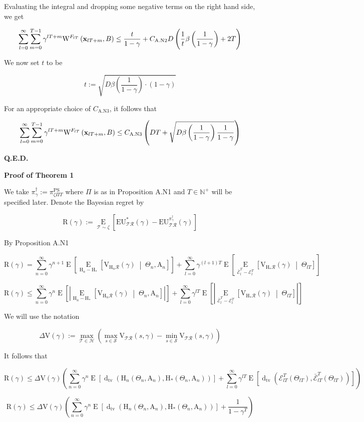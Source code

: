 \documentclass[a4paper]{article}
\newcommand{\Co}[1]{}
\newcommand{\AP}[1]{\left(#1\right)}
\newcommand{\AB}[1]{\left[#1\right]}
\newcommand{\ABM}[2]{\left[#1\;\middle\vert\;#2\right]}
\newcommand{\Ea}[2]{\underset{#1}{\operatorname{E}}\AB{#2}}
\newcommand{\CE}[3]{\underset{#1}{\operatorname{E}}\ABM{#2}{#3}}
\newcommand{\Dtva}[1]{\operatorname{d}_{\text{tv}}\AP{#1}}
\newcommand{\Nats}{\mathbb{N}}
\newcommand{\Abs}[1]{\left\vert #1 \right\vert}
\newcommand{\St}{\mathcal{S}}
\newcommand{\R}{\mathcal{R}}
\newcommand{\T}{\mathcal{T}}
\newcommand{\Hy}{\mathcal{H}}
\newcommand{\V}{\mathrm{V}}
\newcommand{\EU}{\mathrm{EU}}
\newcommand{\Reg}{\mathrm{R}}
\newcommand{\PSR}{\text{PS}}
\newcommand{\W}{\mathrm{W}}
\newcommand{\AT}{\mathrm{A}}
\newcommand{\THy}{\mathrm{H}_*}
\newcommand{\SHy}{\mathrm{H}}
\newcommand{\Ev}{\mathcal{E}}
\newcommand{\De}{\Delta}
\begin{document}
Evaluating the integral and dropping some negative terms on the right hand side, we get

$$\sum_{l=0}^\infty\sum_{m=0}^{T-1}{\gamma^{lT+m}\W^{F_{lT}}\AP{\bold{x}_{lT+m},B}}\leq\frac{t}{1-\gamma}+C_{\text{A.N2}}D \AP{\frac{1}{t}\beta\AP{\frac{1}{1-\gamma}}+2T}$$

We now set $t$ to be

$$t:=\sqrt{D\beta\AP{\frac{1}{1-\gamma}}\cdot(1-\gamma)}$$

For an appropriate choice of $C_{\text{A.N3}}$, it follows that

$$\sum_{l=0}^\infty\sum_{m=0}^{T-1}{\gamma^{lT+m}\W^{F_{lT}}\AP{\bold{x}_{lT+m},B}}\leq C_{\text{A.N3}}\AP{DT+\sqrt{D\beta\AP{\frac{1}{1-\gamma}}\frac{1}{1-\gamma}}}$$

\textbf{Q.E.D.}\Co{b}

\textbf{Proof of Theorem 1}\Co{b}

We take $\pi^\dagger_\gamma:=\pi^\PSR_{\zeta\Pi T}$ where $\Pi$ is as in Proposition A.N1 and $T\in\Nats^+$ will be specified later. Denote the Bayesian regret by

$$\Reg(\gamma):=\Ea{\T\sim\zeta}{\EU^*_{\T\R}(\gamma)-\EU^{\pi_{\gamma}^{\dagger}}_{\T\R}(\gamma)}$$

By Proposition A.N1

$$\Reg(\gamma)=\sum_{n=0}^\infty\gamma^{n+1}\Ea{}{\CE{\SHy_n-\THy}{\V_{\SHy_n\R}(\gamma)}{\Theta_n,\AT_n}}+\sum_{l=0}^\infty{\gamma^{(l+1)T}}\Ea{}{\CE{\bar{\Ev}_{l}^T-\Ev_{l}^T}{\V_{\SHy_*\R}(\gamma)}{\Theta_{lT}}}$$

$$\Reg(\gamma)\leq\sum_{n=0}^\infty\gamma^{n}\Ea{}{\Abs{\CE{\SHy_n-\THy}{\V_{\SHy_n\R}(\gamma)}{\Theta_n,\AT_n}}}+\sum_{l=0}^\infty{\gamma^{lT}}\Ea{}{\Abs{\CE{\bar{\Ev}_{l}^T-\Ev_{l}^T}{\V_{\SHy_*\R}(\gamma)}{\Theta_{lT}}}}$$

We will use the notation

$$\De\V(\gamma):=\max_{\T\in\Hy}{\AP{\max_{s\in\St}{\V_{\T\R}(s,\gamma)}-\min_{s\in\St}{\V_{\T\R}(s,\gamma)}}}$$

It follows that

$$\Reg(\gamma)\leq\Delta\V(\gamma)\AP{\sum_{n=0}^\infty\gamma^{n}\Ea{}{\Dtva{\SHy_n\AP{\Theta_n,\AT_n},\THy\AP{\Theta_n,\AT_n}} }+\sum_{l=0}^\infty\gamma^{lT}\Ea{}{\Dtva{\Ev_{lT}^T\AP{\Theta_{lT}},\bar{\Ev}_{lT}^T\AP{\Theta_{lT}}}}}$$

$$\Reg(\gamma)\leq\Delta\V(\gamma)\AP{\sum_{n=0}^\infty\gamma^{n}\Ea{}{\Dtva{\SHy_n\AP{\Theta_n,\AT_n},\THy\AP{\Theta_n,\AT_n}} }+\frac{1}{1-\gamma^T}}$$
\end{document}
